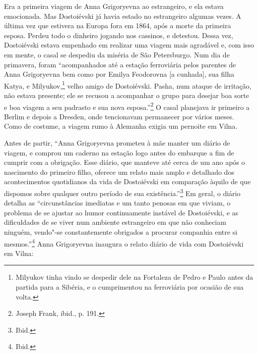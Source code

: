 Era a primeira viagem de Anna Grigoryevna ao estrangeiro, e ela estava
emocionada. Mas Dostoiévski já havia estado no estrangeiro algumas
vezes. A última vez que estivera na Europa fora em 1864, após a morte da
primeira esposa. Perdeu todo o dinheiro jogando nos cassinos, e
detestou. Dessa vez, Dostoiévski estava empenhado em realizar uma viagem
mais agradável e, com isso em mente, o casal se despediu da miséria de
São Petersburgo. Num dia de primavera, foram ``acompanhados até a
estação ferroviária pelos parentes de Anna Grigoryevna bem como por
Emilya Feodorovna {[}a cunhada{]}, sua filha Katya, e Milyukov,\footnote{Milyukov tinha vindo se despedir dele na Fortaleza
de Pedro e Paulo antes da partida para a Sibéria, e o cumprimentou na
ferroviária por ocasião de sua volta.} velho
amigo de Dostoiévski. Pasha, num ataque de irritação,
não estava presente; ele se recusou a acompanhar o grupo para desejar
boa sorte e boa viagem a seu padrasto e sua nova esposa.''\footnote{Joseph Frank, ibid., p. 191.} O casal planejava ir primeiro a Berlim e depois a Dresden, onde tencionavam permanecer por vários meses. Como de
costume, a viagem rumo à Alemanha exigia um pernoite em Vilna.

Antes de partir, ``Anna Grigoryevna prometeu à mãe manter um diário de
viagem, e comprou um caderno na estação logo antes do embarque a fim de
cumprir com a obrigação. Esse diário, que manteve até cerca de um ano
após o nascimento do primeiro filho, oferece um relato mais amplo e
detalhado dos acontecimentos quotidianos da vida de Dostoiévski em
comparação àquilo de que dispomos sobre qualquer outro período de sua
existência.''\footnote{Ibid.} Em geral, o diário detalha as
``circunstâncias imediatas e um tanto penosas em que viviam, o problema
de se ajustar ao humor continuamente instável de Dostoiévski, e as
dificuldades de se viver num ambiente estrangeiro em que não conheciam
ninguém, vendo"-se constantemente obrigados a procurar companhia entre si
mesmos.''\footnote{Ibid.} Anna Grigoryevna inaugura o relato diário de
vida com Dostoiévski em Vilna:

